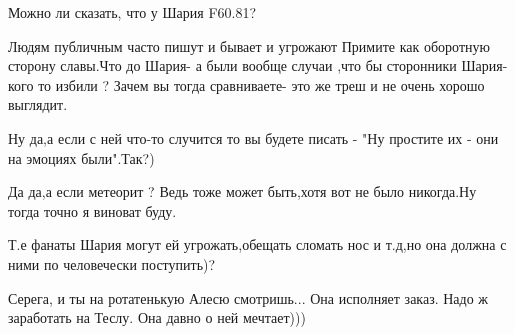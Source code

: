 \begin{itemize}
Можно ли сказать, что у Шария F60.81?

 

Людям публичным часто пишут и бывает и угрожают Примите как оборотную сторону
славы.Что до Шария- а были вообще случаи ,что бы сторонники Шария- кого то
избили ? Зачем вы тогда сравниваете- это же треш и не очень хорошо выглядит.

\begin{itemize}
 
Ну да,а если с ней что-то случится то вы будете писать - "Ну простите их - они на эмоциях были".Так?)

 
Да да,а если метеорит ? Ведь тоже может быть,хотя вот не было никогда.Ну тогда точно я виноват буду.

 
Т.е фанаты Шария могут ей угрожать,обещать сломать нос и т.д,но она должна с ними по человечески поступить)?

 
Серега, и ты на ротатенькую Алесю смотришь... Она исполняет заказ. Надо ж заработать на Теслу. Она давно о ней мечтает)))

 


\end{itemize}
\end{itemize}
